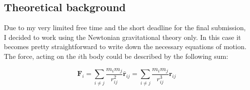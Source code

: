 \begin{multicols}{2}
\section{Theoretical background}
Due to my very limited free time and the short deadline for the final submission, I decided to work using the Newtonian gravitational theory only. In this case it becomes pretty straightforward to write down the necessary equations of motion. The force, acting on the $i$th body could be described by the following sum:

\begin{equation}
\boldsymbol{F}_{i}
=
\sum_{i \neq j} \frac{m_{i} m_{j}}{r_{ij}^{2}} \boldsymbol{\hat{r}}_{ij}
=
\sum_{i \neq j} \frac{m_{i} m_{j}}{r_{ij}^{3}} \boldsymbol{r}_{ij}
\end{equation}

\end{multicols}